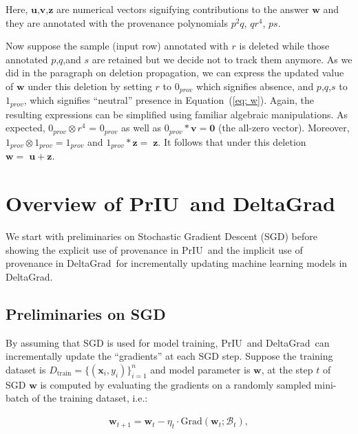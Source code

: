 \documentclass[11pt]{article}
\newcommand{\priu}{PrIU}
\newcommand{\deltagrad}{DeltaGrad}
\newcommand{\w}{\textbf{w}}
\renewcommand{\u}{\textbf{u}}
\renewcommand{\v}{\textbf{v}}
\newcommand{\x}{\textbf{x}}
\newcommand{\y}{y}
\newcommand{\z}{\textbf{z}}
\newcommand{\miniB}{\mathscr{B}}
\begin{document}
Here, $\u$,$\v$,$\z$ are numerical vectors signifying contributions
to the answer $\w$ and they are annotated with the provenance polynomials $p^2q$, $qr^4$, $ps$.

Now suppose the sample (input row) annotated with
$r$ is deleted while those annotated $p$,$q$,and $s$ are retained but we decide not to track them anymore. As we did in the paragraph on deletion
propagation, we can express the updated value of $\w$ under this deletion by setting $r$ to  $0_{prov}$ which signifies absence, 
and $p$,$q$,$s$ to $1_{prov}$, which signifies “neutral” presence in Equation~(\ref{eq: w}). Again, the resulting expressions
can be simplified using familiar algebraic manipulations. As expected,
$0_{prov}\otimes r^4$ = $0_{prov}$ as well as
$0_{prov}*\v = \mathbf{0}$ (the all-zero vector). Moreover,  $1_{prov}\otimes 1_{prov} = 1_{prov}$
and $1_{prov}*\z = \; \z$. It follows
that under this deletion $\w = \; \u + \z$.



% 
 
% 
\section{Overview of \priu\ and \deltagrad}
\label{sec: overview}

We start with preliminaries on Stochastic Gradient Descent (SGD) before showing the explicit use of provenance in \priu\ and the implicit use of provenance in \deltagrad\ for incrementally updating machine learning models in \deltagrad.

\subsection{Preliminaries on SGD}
By assuming that SGD is used for model training, \priu\ and \deltagrad\ can incrementally update the ``gradients'' at each SGD step. Suppose the training dataset is $D_{\text{train}}=\{(\x_i, \y_i)\}_{i=1}^n$ and model parameter is $\w$, at the step $t$ of SGD 
$\w$ is computed by evaluating the gradients on a randomly sampled mini-batch of the training dataset, i.e.:
\begin{small}
\begin{align}\label{eq: sgd}
     \w_{t+1} = \w_{t} - \eta_t \cdot \text{Grad}(\w_t; \miniB_t),
\end{align}
\end{small}
\end{document}
